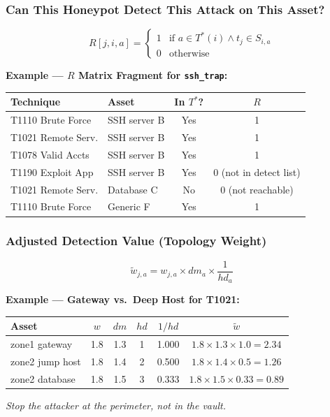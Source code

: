 \documentclass[journal]{IEEEtran}
\newcommand{\tildeW}{\tilde{w}}
\begin{document}
\subsubsection{Can This Honeypot Detect This Attack
              on This Asset?}
\begin{equation}
  R[j,i,a] =
  \begin{cases}
    1 & \text{if } a \in T^*(i) \wedge t_j \in S_{i,a} \\
    0 & \text{otherwise}
  \end{cases}
\end{equation}

\begin{examplebox}
\textbf{Example --- $R$ Matrix Fragment for
\texttt{ssh\_trap}:}
\begin{center}
\small
\renewcommand{\arraystretch}{1.1}
\begin{tabular}{@{}llcc@{}}
\toprule
\textbf{Technique} & \textbf{Asset} & \textbf{In $T^*$?} &
$R$ \\
\midrule
T1110 Brute Force  & SSH server B & Yes & 1 \\
T1021 Remote Serv. & SSH server B & Yes & 1 \\
T1078 Valid Accts  & SSH server B & Yes & 1 \\
T1190 Exploit App  & SSH server B & Yes & 0 (not in detect list) \\
T1021 Remote Serv. & Database C   & No  & 0 (not reachable) \\
T1110 Brute Force  & Generic F    & Yes & 1 \\
\bottomrule
\end{tabular}
\end{center}
\end{examplebox}

\subsubsection{Adjusted Detection Value (Topology Weight)}
\begin{equation}
  \tildeW_{j,a} = w_{j,a} \times dm_a \times \frac{1}{hd_a}
\end{equation}

\begin{examplebox}
\textbf{Example --- Gateway vs.\ Deep Host for T1021:}
\begin{center}
\small
\renewcommand{\arraystretch}{1.1}
\begin{tabular}{@{}lccccc@{}}
\toprule
\textbf{Asset} & $w$ & $dm$ & $hd$ & $1/hd$ & $\tildeW$ \\
\midrule
zone1 gateway   & 1.8 & 1.3 & 1 & 1.000 &
  $1.8\!\times\!1.3\!\times\!1.0=\mathbf{2.34}$ \\
zone2 jump host & 1.8 & 1.4 & 2 & 0.500 &
  $1.8\!\times\!1.4\!\times\!0.5=\mathbf{1.26}$ \\
zone2 database  & 1.8 & 1.5 & 3 & 0.333 &
  $1.8\!\times\!1.5\!\times\!0.33=\mathbf{0.89}$ \\
\bottomrule
\end{tabular}
\end{center}
\textit{Stop the attacker at the perimeter, not in the vault.}
\end{examplebox}
\end{document}
